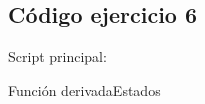 \documentclass[12pt,letterpaper]{article}
\begin{document}
\subsection{Código ejercicio 6}
Script principal:

Función derivadaEstados

\end{document}

